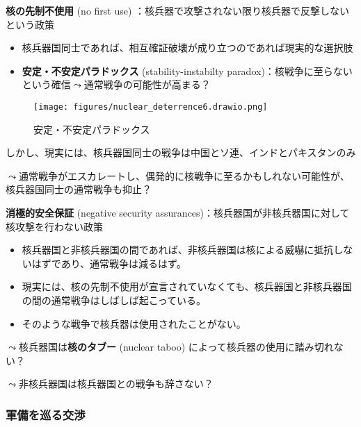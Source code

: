 \documentclass[
  xelatex,
  ja=standard]{bxjsarticle}
\providecommand{\tightlist}{%
  \setlength{\itemsep}{0pt}\setlength{\parskip}{0pt}}\usepackage{longtable,booktabs,array}
\begin{document}
\textbf{核の先制不使用} (no first use)
：核兵器で攻撃されない限り核兵器で反撃しないという政策

\begin{itemize}
\tightlist
\item
  核兵器国同士であれば、相互確証破壊が成り立つのであれば現実的な選択肢
\item
  \textbf{安定・不安定パラドックス} (stability-instabilty
  paradox)：核戦争に至らないという確信\(\leadsto\)通常戦争の可能性が高まる？\citep{jervis1979}
\end{itemize}

\begin{figure}[htpb]

{\centering \texttt{[image: figures/nuclear\_deterrence6.drawio.png]}

}

\caption{安定・不安定パラドックス}

\end{figure}

しかし、現実には、核兵器国同士の戦争は中国とソ連、インドとパキスタンのみ

\(\leadsto\)通常戦争がエスカレートし、偶発的に核戦争に至るかもしれない可能性が、核兵器国同士の通常戦争も抑止？

\textbf{消極的安全保証} (negative security
assurances)：核兵器国が非核兵器国に対して核攻撃を行わない政策

\begin{itemize}
\tightlist
\item
  核兵器国と非核兵器国の間であれば、非核兵器国は核による威嚇に抵抗しないはずであり、通常戦争は減るはず。
\item
  現実には、核の先制不使用が宣言されていなくても、核兵器国と非核兵器国の間の通常戦争はしばしば起こっている。
\item
  そのような戦争で核兵器は使用されたことがない。
\end{itemize}

\(\leadsto\)核兵器国は\textbf{核のタブー} (nuclear taboo)
によって核兵器の使用に踏み切れない？\citep{tannenwald2005}

\(\leadsto\)非核兵器国は核兵器国との戦争も辞さない？

\hypertarget{ux8ecdux5099ux3092ux5de1ux308bux4ea4ux6e09}{%
\subsubsection{軍備を巡る交渉}\label{ux8ecdux5099ux3092ux5de1ux308bux4ea4ux6e09}}
\end{document}
